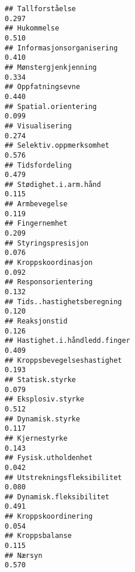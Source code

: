 \documentclass[
]{article}
\begin{document}
\begin{verbatim}
## Tallforståelse                                                                   0.297
## Hukommelse                                                                       0.510
## Informasjonsorganisering                                                         0.410
## Mønstergjenkjenning                                                              0.334
## Oppfatningsevne                                                                  0.440
## Spatial.orientering                                                              0.099
## Visualisering                                                                    0.274
## Selektiv.oppmerksomhet                                                           0.576
## Tidsfordeling                                                                    0.479
## Stødighet.i.arm.hånd                                                             0.115
## Armbevegelse                                                                     0.119
## Fingernemhet                                                                     0.209
## Styringspresisjon                                                                0.076
## Kroppskoordinasjon                                                               0.092
## Responsorientering                                                               0.132
## Tids..hastighetsberegning                                                        0.120
## Reaksjonstid                                                                     0.126
## Hastighet.i.håndledd.finger                                                      0.409
## Kroppsbevegelseshastighet                                                        0.193
## Statisk.styrke                                                                   0.079
## Eksplosiv.styrke                                                                 0.512
## Dynamisk.styrke                                                                  0.117
## Kjernestyrke                                                                     0.143
## Fysisk.utholdenhet                                                               0.042
## Utstrekningsfleksibilitet                                                        0.080
## Dynamisk.fleksibilitet                                                           0.491
## Kroppskoordinering                                                               0.054
## Kroppsbalanse                                                                    0.115
## Nærsyn                                                                           0.570

\end{verbatim}
\end{document}

